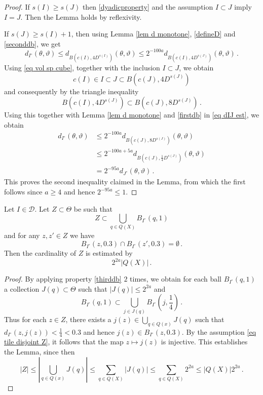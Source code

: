 \begin{proof}
    If $s(I) \ge s(J)$ then \eqref{dyadicproperty} and the assumption $I\subset J$ imply $I = J$. Then the Lemma holds by reflexivity.

    If $s(J) \ge s(I)+1$, then using Lemma \ref{lem d monotone}, \eqref{defineD} and \eqref{seconddb}, we get
    \begin{equation}
    \label{eq dIJ est}
        d_{I^\circ}(\theta, \vartheta) \le d_{B(c(I), 4 D^{s(I)})}(\theta, \vartheta) \le 2^{-100a} d_{B(c(I), 4D^{s(J)})}(\theta, \vartheta)\,.
    \end{equation}
    Using \eqref{eq vol sp cube}, together with the inclusion $I \subset J$, we obtain
    $$
        c(I) \in I \subset J \subset B(c(J), 4 D^{s(J)})
    $$
    and consequently by the triangle inequality
    $$
        B(c(I), 4 D^{s(J)}) \subset B(c(J), 8 D^{s(J)})\,.
    $$
    Using this together with Lemma \ref{lem d monotone} and \eqref{firstdb} in \eqref{eq dIJ est}, we obtain
    \begin{align*}
        d_{I^\circ}(\theta, \vartheta) &\le 2^{-100a} d_{B(c(J), 8D^{s(J)})}(\theta, \vartheta)\\
        &\le 2^{-100a + 5a} d_{B(c(J), \frac{1}{4}D^{s(J)})}(\theta, \vartheta)\\
        &= 2^{-95a}d_{J^\circ}(\theta, \vartheta)\,.
    \end{align*}
    This proves the second inequality claimed in the Lemma, from which the first follows since $a \ge 4$ and hence $2^{-95a} \le 1$.
\end{proof}

\begin{lemma}
    \label{lem tile center 1}
    Let $I \in \mathcal{D}$. Let $Z \subset \Theta$ be such that
    \begin{equation}
        \label{eq tile Z}
        Z \subset \bigcup_{q \in Q(X)} B_{I^\circ}(q, 1)
    \end{equation}
    and for any $z, z' \in Z$ we have
    \begin{equation}
        \label{eq tile disjoint Z}
        B_{I^\circ}(z, 0.3) \cap B_{I^\circ}(z', 0.3) = \emptyset\,.
    \end{equation}
    Then the cardinality of $Z$ is estimated by
    $$
        2^{2a}|Q(X)|\,.
    $$
\end{lemma}

\begin{proof}
    By applying property \eqref{thirddb}  $2$ times, we obtain for each ball $B_{I^\circ}(q,1)$ a collection $J(q) \subset \Theta$ such that $|J(q)| \le 2^{2a}$ and
    $$
        B_{I^\circ}(q,1) \subset \bigcup_{j \in J(q)} B_{I^\circ{}}(j, \frac{1}{4})\,.
    $$
    Thus for each $z \in Z$, there exists a $j(z) \in \bigcup_{q \in Q(x)} J(q)$ such that $d_{I^\circ}(z,j(z)) < \frac{1}{4} <0.3$ and hence $j(z) \in B_{I^\circ}(z, 0.3)$. By the assumption \eqref{eq tile disjoint Z}, it follows that the map $z \mapsto j(z)$ is injective. This establishes the Lemma, since then
    $$
        |Z| \le |\bigcup_{q \in Q(x)} J(q)| \le \sum_{q \in Q(X)}|J(q)| \le \sum_{q \in Q(X)} 2^{2a} \le |Q(X)|2^{2a}\,.
    $$
\end{proof}

